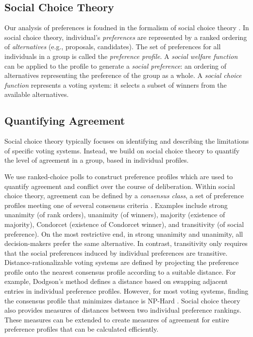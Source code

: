 \subsection{Social Choice Theory}
Our analysis of preferences is foudned in the formalism of social choice theory \cite{arrow_social_2012, gaertner_primer_2009}.
In social choice theory, individual's {\em preferences} are represented by a ranked ordering of {\em alternatives} (e.g., proposals, candidates).
The set of preferences for all individuals in a group is called the {\em preference profile}.
A {\em social welfare function} can be applied to the profile to generate a {\em social preference}: an ordering of alternatives representing the preference of the group as a whole.
A {\em social choice function} represents a voting system: it selects a subset of winners from the available alternatives.

\subsection{Quantifying Agreement}

Social choice theory typically focuses on identifying and describing the limitations of specific voting systems.
Instead, we build on social choice theory to quantify the level of agreement in a group, based in individual profiles.

We use ranked-choice polls to construct preference profiles which are used to quantify agreement and conflict over the course of deliberation.
Within social choice theory, agreement can be defined by a {\em consensus class},
a set of preference profiles meeting one of several consensus criteria
\cite{elkind_rationalizations_2016}.
Examples include strong unanimity (of rank orders),
unanimity (of winners),
majority (existence of majority),
Condorcet (existence of Condorcet winner),
and transitivity (of social preference).
On the most restrictive end, in strong unanimity and unanimity,
all decision-makers prefer the same alternative.
In contrast, transitivity only requires that the social preferences induced by
individual preferences are transitive.
Distance-rationalizable voting systems are defined by projecting the preference
profile onto the nearest consensus profile according to a suitable distance.
For example, Dodgson's method \cite{dodgson_method_1876, brandt_computational_2012}
defines a distance based on swapping adjacent entries in individual preference profiles.
However, for most voting systems,
finding the consensus profile that minimizes distance is NP-Hard
\cite{elkind_rationalizations_2016}.
Social choice theory also provides measures of distances between two individual
preference rankings.
These measures can be extended to create measures of agreement for entire
preference profiles that can be calculated efficiently.


